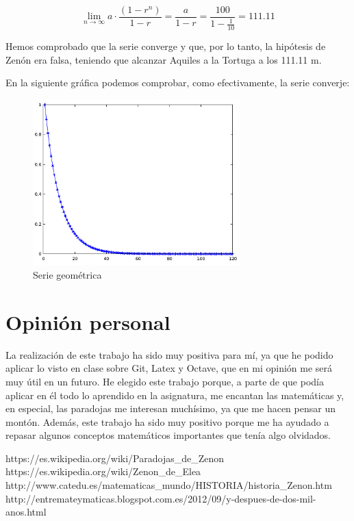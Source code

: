 \documentclass[a4paper,12pt]{article}
\begin{document}
   \begin{equation}
   \lim\limits_{n \rightarrow \infty} a \cdot \frac{(1 - r^n)}{1 - r} = \frac{a}{1 - r} = \frac{100}{1 - \frac{1}{10}} = 111.11
   \end{equation}
   
   Hemos comprobado que la serie converge y que, por lo tanto, la hipótesis de Zenón era falsa,
   teniendo que alcanzar Aquiles a la Tortuga a los 111.11 m.
   
   En la siguiente gráfica podemos comprobar, como efectivamente, la serie converje: \newline
   
   \begin{figure}[h]
   \begin{center}
   \includegraphics[width=8cm]{Octave/SucesionAquilesyTortuga.png}
   \end{center}
   \caption{Serie geométrica}
   \label{fig:aquiles2}
   \end{figure} 
      
   \newpage
   
   \section{Opinión personal}
   
   La realización de este trabajo ha sido muy positiva para mí, ya que he podido aplicar lo visto
   en clase sobre Git, Latex y Octave, que en mi opinión me será muy útil en un futuro.
   He elegido este trabajo porque, a parte de que podía aplicar en él todo lo aprendido en la asignatura,
   me encantan las matemáticas y, en especial, las paradojas me interesan muchísimo, ya que me hacen pensar un montón.
   Además, este trabajo ha sido muy positivo porque me ha ayudado a repasar algunos conceptos matemáticos
   importantes que tenía algo olvidados.
   
   \begin{thebibliography}{99}
   
       https://es.wikipedia.org/wiki/Paradojas\_de\_Zenon
       https://es.wikipedia.org/wiki/Zenon\_de\_Elea
       http://www.catedu.es/matematicas\_mundo/HISTORIA/historia\_Zenon.htm
      http://entremateymaticas.blogspot.com.es/2012/09/y-despues-de-dos-mil-anos.html
      
   \end{thebibliography}
  
\end{document}
